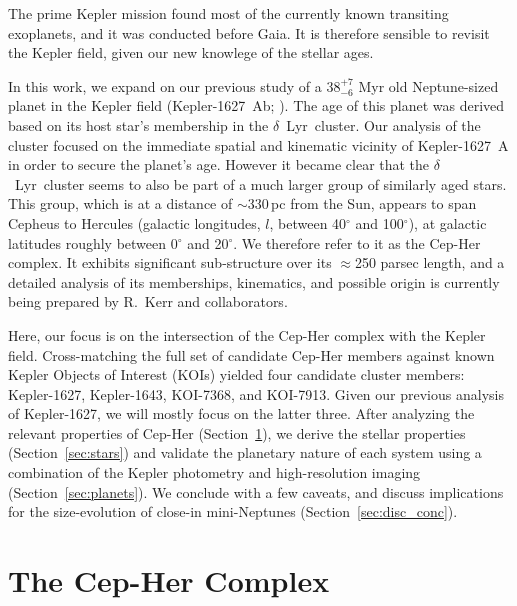 \documentclass[12pt,twocolumn,linenumbers]{aastex63}
\begin{document}
The prime Kepler mission \citep{borucki_kepler_2010} found most of the
currently known transiting exoplanets, and it was conducted before
Gaia.  It is therefore sensible to revisit the Kepler field, given our
new knowlege of the stellar ages.

In this work, we expand on our previous study of a $38^{+7}_{-6}$ Myr
old Neptune-sized planet in the Kepler field (Kepler-1627~Ab;
\citealt{bouma_kep1627_2022}).  The age of this planet was derived
based on its host star's membership in the $\delta$\ Lyr\ cluster.
Our analysis of the cluster focused on the immediate spatial and
kinematic vicinity of Kepler-1627~A in order to secure the planet's
age.  However it became clear that the $\delta$\ Lyr\ cluster seems to
also be part of a much larger group of similarly aged stars.  This
group, which is at a distance of $\sim$330\,pc from the Sun, appears
to span Cepheus to Hercules (galactic longitudes, $l$, between
40$^\circ$ and 100$^\circ$), at galactic latitudes roughly between
0$^\circ$ and 20$^\circ$.  We therefore refer to it as the Cep-Her
complex.  It exhibits significant sub-structure over its $\approx$250
parsec length, and a detailed analysis of its memberships, kinematics,
and possible origin is currently being prepared by R.~Kerr and
collaborators.

Here, our focus is on the intersection of the Cep-Her complex with the
Kepler field.  Cross-matching the full set of candidate Cep-Her
members against known Kepler Objects of Interest (KOIs)
\citep{thompson_planetary_2018} yielded four candidate cluster
members: Kepler-1627, Kepler-1643, KOI-7368, and KOI-7913.  Given our
previous analysis of Kepler-1627, we will mostly focus on the latter
three.  After analyzing the relevant properties of Cep-Her
(Section~\ref{sec:cluster}), we derive the stellar properties
(Section~\ref{sec:stars}) and validate the planetary nature of each
system using a combination of the Kepler photometry and
high-resolution imaging (Section~\ref{sec:planets}).  We conclude with
a few caveats, and discuss implications for the size-evolution of
close-in mini-Neptunes (Section~\ref{sec:disc_conc}).

\section{The Cep-Her Complex}
\label{sec:cluster}
\end{document}
